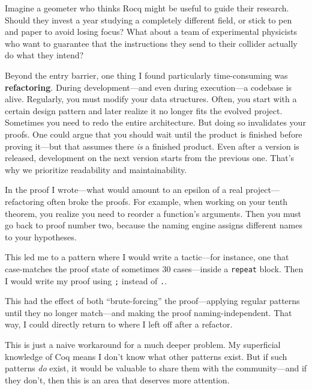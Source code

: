 \documentclass[11pt]{article}
\begin{document}
Imagine a geometer who thinks Rocq might be useful to guide their research. Should they invest a year studying a completely different field, or stick to pen and paper to avoid losing focus? What about a team of experimental physicists who want to guarantee that the instructions they send to their collider actually do what they intend?

Beyond the entry barrier, one thing I found particularly time-consuming was \textbf{refactoring}. During development---and even during execution---a codebase is alive. Regularly, you must modify your data structures. Often, you start with a certain design pattern and later realize it no longer fits the evolved project. Sometimes you need to redo the entire architecture. But doing so invalidates your proofs. One could argue that you should wait until the product is finished before proving it---but that assumes there \textit{is} a finished product. Even after a version is released, development on the next version starts from the previous one. That’s why we prioritize readability and maintainability.

In the proof I wrote---what would amount to an epsilon of a real project---refactoring often broke the proofs. For example, when working on your tenth theorem, you realize you need to reorder a function’s arguments. Then you must go back to proof number two, because the naming engine assigns different names to your hypotheses.

This led me to a pattern where I would write a tactic---for instance, one that case-matches the proof state of sometimes 30 cases---inside a \texttt{repeat} block. Then I would write my proof using \texttt{;} instead of \texttt{.}.

This had the effect of both “brute-forcing” the proof---applying regular patterns until they no longer match---and making the proof naming-independent. That way, I could directly return to where I left off after a refactor.

This is just a naive workaround for a much deeper problem. My superficial knowledge of Coq means I don’t know what other patterns exist. But if such patterns \textit{do} exist, it would be valuable to share them with the community---and if they don’t, then this is an area that deserves more attention.
\end{document}
